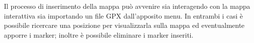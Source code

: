 \documentclass{natourDoc}
\begin{document}
\newpage
Il processo di inserimento della mappa può avvenire sia interagendo con la mappa interattiva sia importando 
un file GPX dall'apposito menu. In entrambi i casi è possibile ricercare una posizione per visualizzarla sulla mappa 
ed eventualmente apporre i marker; inoltre è possibile eliminare i marker inseriti.

\begin{figure}[htbp]
	\centering
	\begin{minipage}[t]{0.4\textwidth}

\end{minipage}
\end{figure}
\end{document}
